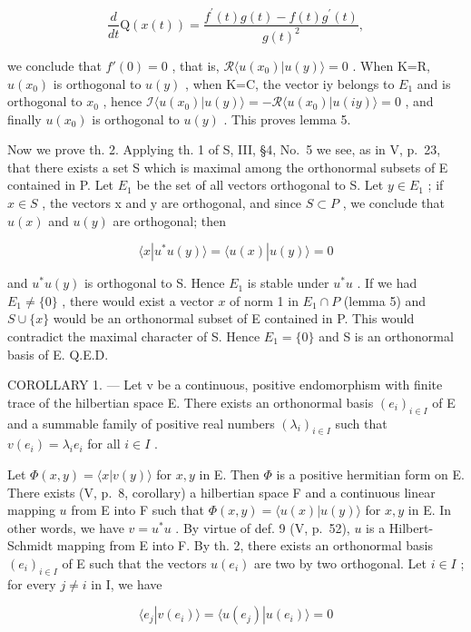 \[
\frac {d}{d t} \mathrm{Q} (x (t)) = \frac {f ^ {\prime} (t) g (t) - f (t) g ^ {\prime} (t)}{g (t) ^ {2}},
\]

we conclude that \(f'(0)=0\) , that is, \(\mathcal{R}\langle u(x_{0})|u(y)\rangle=0\) . When K=R, \(u(x_{0})\) is orthogonal to \(u(y)\) , when K=C, the vector iy belongs to \(E_{1}\) and is orthogonal to \(x_{0}\) , hence \(\mathcal{I}\langle u(x_{0})|u(y)\rangle=-\mathcal{R}\langle u(x_{0})|u(iy)\rangle=0\) , and finally \(u(x_{0})\) is orthogonal to \(u(y)\) . This proves lemma 5.

Now we prove th. 2. Applying th. 1 of S, III, §4, No.~5 we see, as in V, p.~23, that there exists a set S which is maximal among the orthonormal subsets of E contained in P. Let \(E_{1}\) be the set of all vectors orthogonal to S. Let \(y \in E_{1}\) ; if \(x \in S\) , the vectors x and y are orthogonal, and since \(S \subset P\) , we conclude that \(u(x)\) and \(u(y)\) are orthogonal; then

\[
\langle x | u ^ {*} u (y) \rangle = \langle u (x) | u (y) \rangle = 0
\]

and \(u^{*}u(y)\) is orthogonal to S. Hence \(E_{1}\) is stable under \(u^{*}u\) . If we had \(E_{1} \neq \{0\}\) , there would exist a vector \(x\) of norm 1 in \(E_{1} \cap P\) (lemma 5) and \(S \cup \{x\}\) would be an orthonormal subset of E contained in P. This would contradict the maximal character of S. Hence \(E_{1} = \{0\}\) and S is an orthonormal basis of E. Q.E.D.

COROLLARY 1. --- Let v be a continuous, positive endomorphism with finite trace of the hilbertian space E. There exists an orthonormal basis \((e_{i})_{i\in I}\) of E and a summable family of positive real numbers \((\lambda_{i})_{i\in I}\) such that \(v(e_{i}) = \lambda_{i}e_{i}\) for all \(i \in I\) .

Let \(\Phi(x, y) = \langle x | v(y) \rangle\) for \(x, y\) in E. Then \(\Phi\) is a positive hermitian form on E. There exists (V, p.~8, corollary) a hilbertian space F and a continuous linear mapping \(u\) from E into F such that \(\Phi(x, y) = \langle u(x) | u(y) \rangle\) for \(x, y\) in E. In other words, we have \(v = u^{*}u\) . By virtue of def. 9 (V, p.~52), \(u\) is a Hilbert-Schmidt mapping from E into F. By th. 2, there exists an orthonormal basis \((e_{i})_{i \in I}\) of E such that the vectors \(u(e_{i})\) are two by two orthogonal. Let \(i \in I\) ; for every \(j \neq i\) in I, we have

\[
\langle e _ {j} | v (e _ {i}) \rangle = \langle u (e _ {j}) | u (e _ {i}) \rangle = 0
\]

